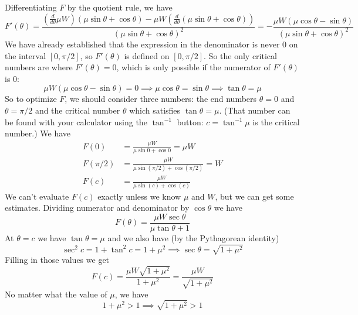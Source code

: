 \documentclass{article}
\begin{document}
\begin{enumerate}
  Differentiating $F$ by the quotient rule, we have
  \begin{equation*}
    F'(\theta) = \frac{\left(\frac{d}{d\theta} \mu W\right)
      (\mu\sin\theta + \cos\theta) 
      - \mu W\left(\frac{d}{d\theta} (\mu\sin\theta + \cos\theta)\right)}{
      (\mu\sin\theta+\cos\theta)^2}
    = -\frac{\mu W (\mu\cos\theta - \sin\theta)}{(\mu\sin\theta+\cos\theta)^2}
  \end{equation*}
  We have already established that the expression in the denominator is never
  $0$ on the interval $[0,\pi/2]$, so $F'(\theta)$ is defined on $[0,\pi/2]$.
  So the only critical numbers are where $F'(\theta)=0$, which is only possible
  if the numerator of $F'(\theta)$ is $0$:
  \begin{equation*}
    \mu W(\mu\cos\theta-\sin\theta)=0
    \implies \mu\cos\theta=\sin\theta
    \implies \tan\theta = \mu
  \end{equation*}
  So to optimize $F$, we should consider three numbers: the end numbers
  $\theta=0$ and $\theta=\pi/2$ and the critical number $\theta$ which 
  satisfies $\tan\theta = \mu$.  (That number can be found with your calculator
  using the $\tan^{-1}$ button: $c=\tan^{-1}\mu$ is the critical number.)  
  We have
  \begin{align*}
    F(0) &= \frac{\mu W}{\mu\sin 0 + \cos 0} = \mu W \\
    F(\pi/2) &= \frac{\mu W}{\mu \sin(\pi/2) + \cos(\pi/2)} = W \\
    F(c) &= \frac{\mu W}{\mu\sin(c)+\cos(c)}
  \end{align*}
  We can't evaluate $F(c)$ exactly unless we know $\mu$ and $W$,
  but we can get some estimates.  
  Dividing numerator and denominator by $\cos\theta$ we have
  \begin{equation*}
    F(\theta) = \frac{\mu W\sec\theta}{\mu\tan\theta+1}
  \end{equation*}
  At $\theta=c$ we have $\tan\theta=\mu$ and we also have (by the Pythagorean
  identity)
  \begin{equation*}
    \sec^2 c = 1 + \tan^2 c = 1 +\mu^2 \implies \sec\theta = \sqrt{1+\mu^2}
  \end{equation*}
  Filling in those values we get
  \begin{equation*}
    F(c) = \frac{\mu W\sqrt{1+\mu^2}}{1+\mu^2} = \frac{\mu W}{\sqrt{1+\mu^2}}
  \end{equation*}
  No matter what the value of $\mu$, we have 
  \begin{equation*}
    1+\mu^2>1 \implies \sqrt{1+\mu^2}>1 

\end{equation*}
\end{enumerate}
\end{document}
